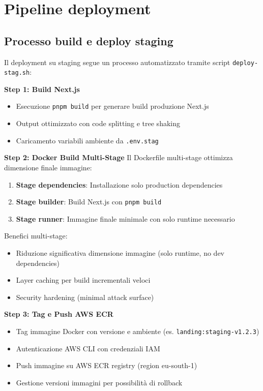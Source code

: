 \section{Pipeline deployment}

\subsection{Processo build e deploy staging}
Il deployment su staging segue un processo automatizzato tramite script \texttt{deploy-stag.sh}:

\textbf{Step 1: Build Next.js}
\begin{itemize}
  \item Esecuzione \texttt{pnpm build} per generare build produzione Next.js
  \item Output ottimizzato con code splitting e tree shaking
  \item Caricamento variabili ambiente da \texttt{.env.stag}
\end{itemize}

\textbf{Step 2: Docker Build Multi-Stage}
Il Dockerfile multi-stage ottimizza dimensione finale immagine:
\begin{enumerate}
  \item \textbf{Stage dependencies}: Installazione solo production dependencies
  \item \textbf{Stage builder}: Build Next.js con \texttt{pnpm build}
  \item \textbf{Stage runner}: Immagine finale minimale con solo runtime necessario
\end{enumerate}

Benefici multi-stage:
\begin{itemize}
  \item Riduzione significativa dimensione immagine (solo runtime, no dev dependencies)
  \item Layer caching per build incrementali veloci
  \item Security hardening (minimal attack surface)
\end{itemize}

\textbf{Step 3: Tag e Push AWS ECR}
\begin{itemize}
  \item Tag immagine Docker con versione e ambiente (es. \texttt{landing:staging-v1.2.3})
  \item Autenticazione AWS CLI con credenziali IAM
  \item Push immagine su AWS ECR registry (region eu-south-1)
  \item Gestione versioni immagini per possibilità di rollback
\end{itemize}

